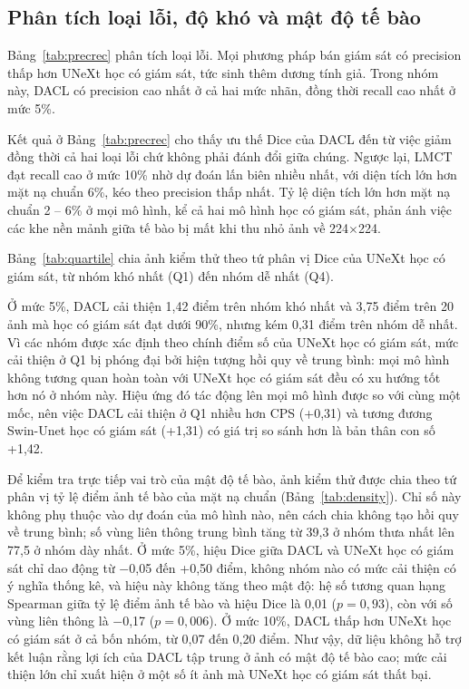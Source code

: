 \documentclass{IEEEtran}
\begin{document}
\subsection{Phân tích loại lỗi, độ khó và mật độ tế bào}

Bảng~\ref{tab:precrec} phân tích loại lỗi. Mọi phương pháp bán giám sát có precision thấp hơn UNeXt học có giám sát, tức sinh thêm dương tính giả. Trong nhóm này, DACL có precision cao nhất ở cả hai mức nhãn, đồng thời recall cao nhất ở mức 5\%.



Kết quả ở Bảng~\ref{tab:precrec} cho thấy ưu thế Dice của DACL đến từ việc giảm đồng thời cả hai loại lỗi chứ không phải đánh đổi giữa chúng. Ngược lại, LMCT đạt recall cao ở mức 10\% nhờ dự đoán lấn biên nhiều nhất, với diện tích lớn hơn mặt nạ chuẩn 6\%, kéo theo precision thấp nhất. Tỷ lệ diện tích lớn hơn mặt nạ chuẩn 2 -- 6\% ở mọi mô hình, kể cả hai mô hình học có giám sát, phản ánh việc các khe nền mảnh giữa tế bào bị mất khi thu nhỏ ảnh về 224$\times$224.

Bảng~\ref{tab:quartile} chia ảnh kiểm thử theo tứ phân vị Dice của UNeXt học có giám sát, từ nhóm khó nhất (Q1) đến nhóm dễ nhất (Q4).



Ở mức 5\%, DACL cải thiện 1,42 điểm trên nhóm khó nhất và 3,75 điểm trên 20 ảnh mà học có giám sát đạt dưới 90\%, nhưng kém 0,31 điểm trên nhóm dễ nhất. Vì các nhóm được xác định theo chính điểm số của UNeXt học có giám sát, mức cải thiện ở Q1 bị phóng đại bởi hiện tượng hồi quy về trung bình: mọi mô hình không tương quan hoàn toàn với UNeXt học có giám sát đều có xu hướng tốt hơn nó ở nhóm này. Hiệu ứng đó tác động lên mọi mô hình được so với cùng một mốc, nên việc DACL cải thiện ở Q1 nhiều hơn CPS (+0,31) và tương đương Swin-Unet học có giám sát (+1,31) có giá trị so sánh hơn là bản thân con số +1,42.



Để kiểm tra trực tiếp vai trò của mật độ tế bào, ảnh kiểm thử được chia theo tứ phân vị tỷ lệ điểm ảnh tế bào của mặt nạ chuẩn (Bảng~\ref{tab:density}). Chỉ số này không phụ thuộc vào dự đoán của mô hình nào, nên cách chia không tạo hồi quy về trung bình; số vùng liên thông trung bình tăng từ 39,3 ở nhóm thưa nhất lên 77,5 ở nhóm dày nhất. Ở mức 5\%, hiệu Dice giữa DACL và UNeXt học có giám sát chỉ dao động từ $-$0,05 đến +0,50 điểm, không nhóm nào có mức cải thiện có ý nghĩa thống kê, và hiệu này không tăng theo mật độ: hệ số tương quan hạng Spearman giữa tỷ lệ điểm ảnh tế bào và hiệu Dice là 0,01 ($p=0{,}93$), còn với số vùng liên thông là $-$0,17 ($p=0{,}006$). Ở mức 10\%, DACL thấp hơn UNeXt học có giám sát ở cả bốn nhóm, từ 0,07 đến 0,20 điểm. Như vậy, dữ liệu không hỗ trợ kết luận rằng lợi ích của DACL tập trung ở ảnh có mật độ tế bào cao; mức cải thiện lớn chỉ xuất hiện ở một số ít ảnh mà UNeXt học có giám sát thất bại.
\end{document}
